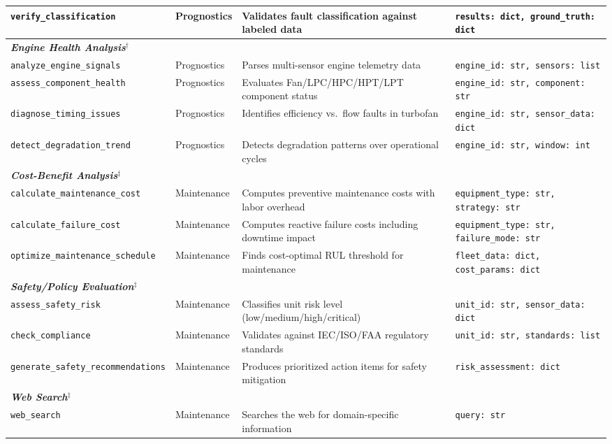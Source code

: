 \begin{table}[ht]
\begin{tabular}{@{}llll@{}}
\texttt{verify\_classification} & Prognostics & Validates fault classification against labeled data & \texttt{results: dict, ground\_truth: dict} \\
\midrule
\multicolumn{4}{l}{\textbf{\textit{Engine Health Analysis}}$^\dagger$} \\
\texttt{analyze\_engine\_signals} & Prognostics & Parses multi-sensor engine telemetry data & \texttt{engine\_id: str, sensors: list} \\
\texttt{assess\_component\_health} & Prognostics & Evaluates Fan/LPC/HPC/HPT/LPT component status & \texttt{engine\_id: str, component: str} \\
\texttt{diagnose\_timing\_issues} & Prognostics & Identifies efficiency vs.\ flow faults in turbofan & \texttt{engine\_id: str, sensor\_data: dict} \\
\texttt{detect\_degradation\_trend} & Prognostics & Detects degradation patterns over operational cycles & \texttt{engine\_id: str, window: int} \\
\midrule
\multicolumn{4}{l}{\textbf{\textit{Cost-Benefit Analysis}}$^\ddagger$} \\
\texttt{calculate\_maintenance\_cost} & Maintenance & Computes preventive maintenance costs with labor overhead & \texttt{equipment\_type: str, strategy: str} \\
\texttt{calculate\_failure\_cost} & Maintenance & Computes reactive failure costs including downtime impact & \texttt{equipment\_type: str, failure\_mode: str} \\
\texttt{optimize\_maintenance\_schedule} & Maintenance & Finds cost-optimal RUL threshold for maintenance & \texttt{fleet\_data: dict, cost\_params: dict} \\
\midrule
\multicolumn{4}{l}{\textbf{\textit{Safety/Policy Evaluation}}$^\ddagger$} \\
\texttt{assess\_safety\_risk} & Maintenance & Classifies unit risk level (low/medium/high/critical) & \texttt{unit\_id: str, sensor\_data: dict} \\
\texttt{check\_compliance} & Maintenance & Validates against IEC/ISO/FAA regulatory standards & \texttt{unit\_id: str, standards: list} \\
\texttt{generate\_safety\_recommendations} & Maintenance & Produces prioritized action items for safety mitigation & \texttt{risk\_assessment: dict} \\
\midrule
\multicolumn{4}{l}{\textbf{\textit{Web Search}}$^\ddagger$} \\
\texttt{web\_search} & Maintenance & Searches the web for domain-specific information & \texttt{query: str} \\
\bottomrule
\end{tabular}
\end{table}